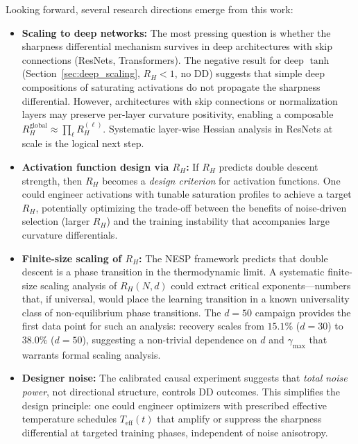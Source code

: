\documentclass[
  journal=largetwo,
  simfonts=false,
  year=2025,
  volume=37,
]{cup-journal}
\begin{document}
Looking forward, several research directions emerge from this work:

\begin{itemize}
    \item \textbf{Scaling to deep networks:} The most pressing question is whether the sharpness differential mechanism survives in deep architectures with skip connections (ResNets, Transformers). The negative result for deep $\tanh$ (Section~\ref{sec:deep_scaling}, $R_H < 1$, no DD) suggests that simple deep compositions of saturating activations do not propagate the sharpness differential. However, architectures with skip connections or normalization layers may preserve per-layer curvature positivity, enabling a composable $R_H^{\mathrm{global}} \approx \prod_\ell R_H^{(\ell)}$. Systematic layer-wise Hessian analysis in ResNets at scale is the logical next step.

    \item \textbf{Activation function design via $R_H$:} If $R_H$ predicts double descent strength, then $R_H$ becomes a \textit{design criterion} for activation functions. One could engineer activations with tunable saturation profiles to achieve a target $R_H$, potentially optimizing the trade-off between the benefits of noise-driven selection (larger $R_H$) and the training instability that accompanies large curvature differentials.

    \item \textbf{Finite-size scaling of $R_H$:} The NESP framework predicts that double descent is a phase transition in the thermodynamic limit. A systematic finite-size scaling analysis of $R_H(N, d)$ could extract critical exponents---numbers that, if universal, would place the learning transition in a known universality class of non-equilibrium phase transitions. The $d=50$ campaign provides the first data point for such an analysis: recovery scales from $15.1\%$ ($d=30$) to $38.0\%$ ($d=50$), suggesting a non-trivial dependence on $d$ and $\gamma_{\max}$ that warrants formal scaling analysis.

    \item \textbf{Designer noise:} The calibrated causal experiment suggests that \emph{total noise power}, not directional structure, controls DD outcomes. This simplifies the design principle: one could engineer optimizers with prescribed effective temperature schedules $T_{\mathrm{eff}}(t)$ that amplify or suppress the sharpness differential at targeted training phases, independent of noise anisotropy.


\end{itemize}
\end{document}
